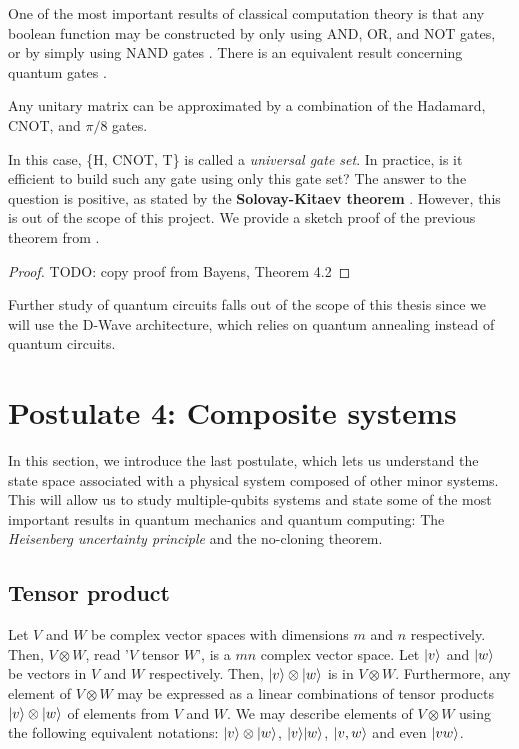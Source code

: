 One of the most important results of classical computation theory is that any boolean function may be constructed by only using AND, OR, and NOT gates, or by simply using NAND gates \cite{Lau2006}. There is an equivalent result concerning quantum gates \cite{Bayens2019}.

\begin{theorem}
	Any unitary matrix can be approximated by a combination of the Hadamard, CNOT, and $\pi/8$ gates.
\end{theorem}

In this case, \{H, CNOT, T\} is called a \emph{universal gate set}. In practice, is it efficient to build such any gate using only this gate set? The answer to the question is positive, as stated by the \textbf{Solovay-Kitaev theorem} \cite{Dawson2006}. However, this is out of the scope of this project. We provide a sketch proof of the previous theorem from \cite{Bayens2019}.

\begin{proof}
	TODO: copy proof from Bayens, Theorem 4.2
\end{proof}

Further study of quantum circuits falls out of the scope of this thesis since we will use the D-Wave architecture, which relies on quantum annealing instead of quantum circuits.

\section{Postulate 4: Composite systems}


In this section, we introduce the last postulate, which lets us understand the state space associated with a physical system composed of other minor systems. This will allow us to study multiple-qubits systems and state some of the most important results in quantum mechanics and quantum computing: The \emph{Heisenberg uncertainty principle} and the no-cloning theorem.


\subsection{Tensor product}


Let $V$ and $W$ be complex vector spaces with dimensions $m$ and $n$ respectively. Then, $V \otimes W$, read '$V$ tensor $W$', is a $mn$ complex vector space. Let $|v\rangle$ and $|w\rangle$ be vectors in $V$ and $W$ respectively. Then, $|v\rangle \otimes |w\rangle$ is in $V \otimes W$. Furthermore, any element of $V \otimes W$ may be expressed as a linear combinations of tensor products $|v\rangle \otimes |w\rangle$ of elements from $V$ and $W$. We may describe elements of $V \otimes W$ using the following equivalent notations: $|v\rangle \otimes |w\rangle$, $|v\rangle|w\rangle$, $|v, w\rangle$ and even $|vw\rangle$.

